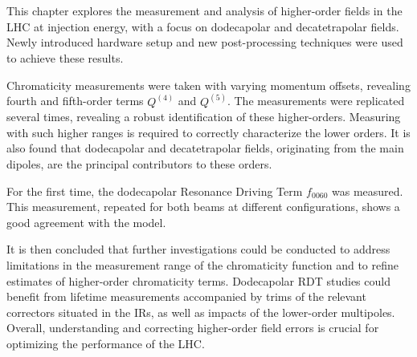 











\section{}

This chapter explores the measurement and analysis of higher-order fields in the LHC at injection 
energy, with a focus on dodecapolar and decatetrapolar fields. Newly introduced hardware setup and
new post-processing techniques were used to achieve these results.

Chromaticity measurements were taken with varying momentum offsets, revealing fourth and fifth-order
terms $Q^{(4)}$ and $Q^{(5)}$. The measurements were replicated several times, revealing a robust 
identification of these higher-orders. Measuring with such higher ranges is required to correctly
characterize the lower orders.  It is also found that dodecapolar and decatetrapolar fields,
originating from the main dipoles, are the principal contributors to these orders.

For the first time, the dodecapolar Resonance Driving Term $f_{0060}$ was measured. This
measurement, repeated for both beams at different configurations, shows a good agreement with the
model.

It is then concluded that further investigations could be conducted to address limitations in the
measurement range of the chromaticity function and to refine estimates of higher-order chromaticity
terms. Dodecapolar RDT studies could benefit from lifetime measurements accompanied by trims of
the relevant correctors situated in the IRs, as well as impacts of the lower-order multipoles.
Overall, understanding and correcting higher-order field errors is crucial for optimizing the
performance of the LHC.